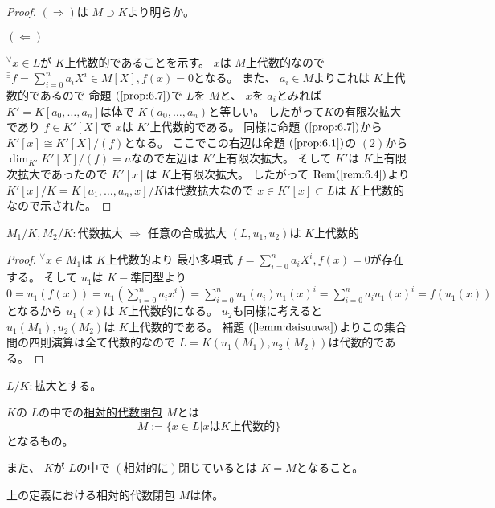 \documentclass[../master_galois_theory]{subfiles}
\begin{document}
\begin{proof}
  $(\Rightarrow)$は $M \supset K$より明らか。

  $(\Leftarrow)$

  ${}^\forall x \in L$が $K$上代数的であることを示す。
  $x$は $M$上代数的なので ${}^\exists f = \sum_{i=0}^n a_i X^i \in M[X] , f(x) = 0$となる。
  また、 $a_i \in M$よりこれは $K$上代数的であるので
  命題 $(\mathrm{\ref{prop:6.7}})$で $L$を $M$と、 $x$を $a_i$とみれば
  $K' = K[a_0 , \dots , a_n]$は体で $K(a_0 , \dots , a_n)$と等しい。
  したがって$K$の有限次拡大であり $f \in K'[X]$で $x$は $K'$上代数的である。
  同様に命題 $(\mathrm{\ref{prop:6.7}})$から $K'[x] \cong K'[X]/(f)$となる。
  ここでこの右辺は命題 $(\mathrm{\ref{prop:6.1}})$の $(2)$から
  $\dim_{K'} K'[X]/(f) = n$なので左辺は $K'$上有限次拡大。
  そして $K'$は $K$上有限次拡大であったので $K'[x]$は $K$上有限次拡大。
  したがって $\mathrm{Rem} (\mathrm{\ref{rem:6.4}})$より
  $K'[x]/K = K[a_1 , \dots , a_n , x]/K$は代数拡大なので
  $x \in K'[x] \subset L$は $K$上代数的なので示された。
\end{proof}

\begin{prop}
  $M_1/K , M_2/K:$代数拡大 $\Rightarrow$ 任意の合成拡大 $(L,u_1,u_2)$は $K$上代数的
\end{prop}

\begin{proof}
  ${}^\forall x \in M_1$は $K$上代数的より
  最小多項式 $f = \sum_{i=0}^n a_i X^i , f(x) = 0$が存在する。
  そして $u_1$は $K-$準同型より $0 = u_1(f(x)) = u_1(\sum_{i=0}^n a_i x^i) = \sum_{i=0}^n u_1(a_i) u_1(x)^i = \sum_{i=0}^n a_i u_1(x)^i = f(u_1(x))$
  となるから $u_1(x)$は $K$上代数的になる。
  $u_2$も同様に考えると $u_1(M_1) , u_2(M_2)$は $K$上代数的である。
  補題 $(\mathrm{\ref{lemm:daisuuwa}})$よりこの集合間の四則演算は全て代数的なので
  $L = K(u_1(M_1) , u_2(M_2))$は代数的である。
\end{proof}

\begin{defi}
  $L/K:$拡大とする。

  $K$の $L$の中での\underline{相対的代数閉包} $M$とは
  \[
  M := \{ x \in L | x は K上代数的\}
  \]
  となるもの。

  また、 $K$が\underline{ $L$の中で $(相対的に)$閉じている}とは
  $K = M$となること。
\end{defi}

\begin{prop}
  上の定義における相対的代数閉包 $M$は体。
\end{prop}
\end{document}
